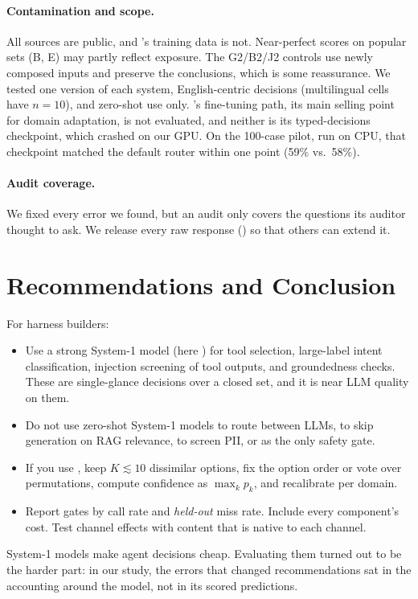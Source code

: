\paragraph{Contamination and scope.}
All sources are public, and \jev{}'s training data is not. Near-perfect scores on popular sets (B, E) may partly reflect exposure. The G2/B2/J2 controls use newly composed inputs and preserve the conclusions, which is some reassurance. We tested one version of each system, English-centric decisions (multilingual cells have $n{=}10$), and zero-shot use only. \laya{}'s fine-tuning path, its main selling point for domain adaptation, is not evaluated, and neither is its typed-decisions checkpoint, which crashed on our GPU. On the 100-case pilot, run on CPU, that checkpoint matched the default router within one point (59\% vs.\ 58\%).

\paragraph{Audit coverage.}
We fixed every error we found, but an audit only covers the questions its auditor thought to ask. We release every raw response (\codeurl{}) so that others can extend it.

\section{Recommendations and Conclusion}
For harness builders:
\begin{itemize}
\item Use a strong System-1 model (here \jev{}) for tool selection, large-label intent classification, injection screening of tool outputs, and groundedness checks. These are single-glance decisions over a closed set, and it is near LLM quality on them.
\item Do not use zero-shot System-1 models to route between LLMs, to skip generation on RAG relevance, to screen PII, or as the only safety gate.
\item If you use \laya{}, keep $K\lesssim10$ dissimilar options, fix the option order or vote over permutations, compute confidence as $\max_k p_k$, and recalibrate per domain.
\item Report gates by call rate and \emph{held-out} miss rate. Include every component's cost. Test channel effects with content that is native to each channel.
\end{itemize}
System-1 models make agent decisions cheap. Evaluating them turned out to be the harder part: in our study, the errors that changed recommendations sat in the accounting around the model, not in its scored predictions.
